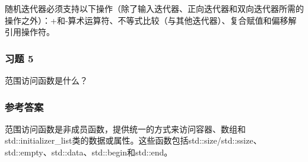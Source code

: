 随机迭代器必须支持以下操作（除了输入迭代器、正向迭代器和双向迭代器所需的操作之外）：+和-算术运算符、不等式比较（与其他迭代器）、复合赋值和偏移解引用操作符。

\subsubsection{习题 5}

范围访问函数是什么？

\subsubsection{参考答案}

范围访问函数是非成员函数，提供统一的方式来访问容器、数组和std::initializer_list类的数据或属性。这些函数包括std::size/std::ssize、std::empty、std::data、std::begin和std::end。












